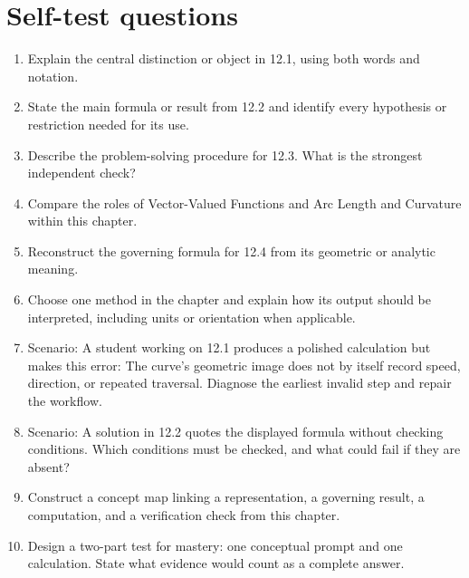 \documentclass[11pt]{article}
\begin{document}
\section{Self-test questions}
\begin{enumerate}
\item Explain the central distinction or object in 12.1, using both words and notation.
\item State the main formula or result from 12.2 and identify every hypothesis or restriction needed for its use.
\item Describe the problem-solving procedure for 12.3. What is the strongest independent check?
\item Compare the roles of Vector-Valued Functions and Arc Length and Curvature within this chapter.
\item Reconstruct the governing formula for 12.4 from its geometric or analytic meaning.
\item Choose one method in the chapter and explain how its output should be interpreted, including units or orientation when applicable.
\item Scenario: A student working on 12.1 produces a polished calculation but makes this error: The curve's geometric image does not by itself record speed, direction, or repeated traversal. Diagnose the earliest invalid step and repair the workflow.
\item Scenario: A solution in 12.2 quotes the displayed formula without checking conditions. Which conditions must be checked, and what could fail if they are absent?
\item Construct a concept map linking a representation, a governing result, a computation, and a verification check from this chapter.
\item Design a two-part test for mastery: one conceptual prompt and one calculation. State what evidence would count as a complete answer.
\end{enumerate}

\end{document}
